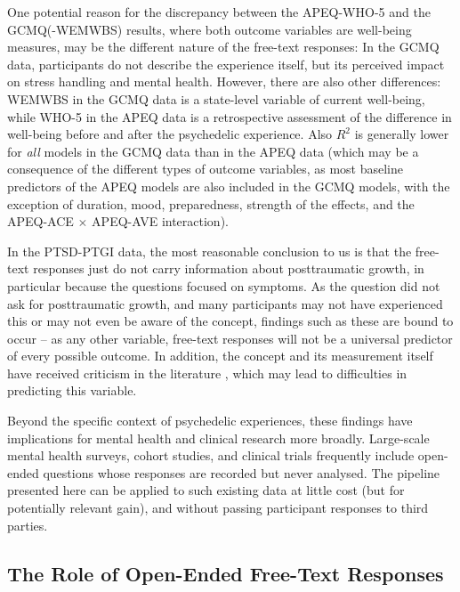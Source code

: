 \documentclass[man,floatsintext]{apa7}
\newcommand{\change}[1]{#1}
\begin{document}
One potential reason for the discrepancy between the APEQ-WHO-5 and the GCMQ(-WEMWBS) results, where both outcome variables are well-being measures, may be the different nature of the free-text responses: In the GCMQ data, participants do not describe the experience itself, but its perceived impact on stress handling and mental health. However, there are also other differences: WEMWBS in the GCMQ data is a state-level variable of current well-being, while WHO-5 in the APEQ data is a retrospective assessment of the difference in well-being before and after the psychedelic experience. Also $R^2$ is generally lower for \emph{all} models in the GCMQ data than in the APEQ data (which may be a consequence of the different types of outcome variables, as \change{most} baseline predictors of the APEQ models are also \change{included} in the GCMQ models\change{, with the exception of duration, mood, preparedness, strength of the effects, and the APEQ-ACE $\times$ APEQ-AVE interaction}).

In the PTSD-PTGI data, the most reasonable conclusion to us is that the free-text responses just do not carry information about posttraumatic growth, \change{in particular because the questions focused on symptoms}. As the question did not ask for posttraumatic growth, and many participants may not have experienced this or may not even be aware of the concept, findings such as these are bound to occur -- as any other variable, free-text responses will not be a universal predictor of every possible outcome. In addition, the concept and its measurement itself have received criticism in the literature \cite{frazier2009does,jayawickreme2021post}, which may lead to difficulties in predicting this variable. 

\change{Beyond the specific context of psychedelic experiences, these findings have implications for mental health and clinical research more broadly. Large-scale mental health surveys, cohort studies, and clinical trials frequently include open-ended questions whose responses are recorded but never analysed. The pipeline presented here can be applied to such existing data at little cost (but for potentially relevant gain), and without passing participant responses to third parties. }

\subsection{The Role of Open-Ended Free-Text Responses}
\end{document}
